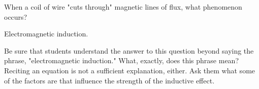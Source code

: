 

When a coil of wire "cuts through" magnetic lines of flux, what phenomenon occurs?







Electromagnetic induction.







Be sure that students understand the answer to this question beyond saying the phrase, "electromagnetic induction."  What, exactly, does this phrase mean?  Reciting an equation is not a sufficient explanation, either.  Ask them what some of the factors are that influence the strength of the inductive effect.





